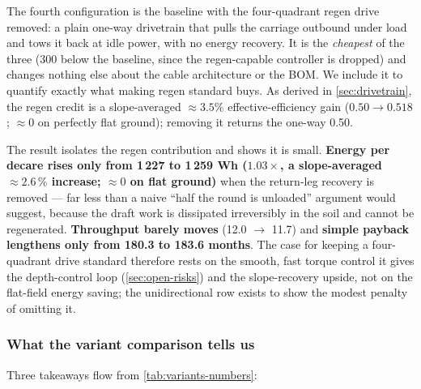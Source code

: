 \documentclass[11pt,a4paper]{article}
\begin{document}
The fourth configuration is the baseline with the four-quadrant regen drive removed: a plain one-way drivetrain that pulls the carriage outbound under load and tows it back at idle power, with no energy recovery. It is the \emph{cheapest} of the three (\SI{300}{\EUR} below the baseline, since the regen-capable controller is dropped) and changes nothing else about the cable architecture or the BOM. We include it to quantify exactly what making regen standard buys. As derived in \cref{sec:drivetrain}, the regen credit is a slope-averaged ${\approx}3.5\%$ effective-efficiency gain ($0.50 \to 0.518$; ${\approx}0$ on perfectly flat ground); removing it returns the one-way 0.50.

The result isolates the regen contribution and shows it is small. \textbf{Energy per decare rises only from 1\,227 to 1\,259 Wh ($1.03\times$, a slope-averaged ${\approx}2.6\,\%$ increase; ${\approx}0$ on flat ground)} when the return-leg recovery is removed --- far less than a naive ``half the round is unloaded'' argument would suggest, because the draft work is dissipated irreversibly in the soil and cannot be regenerated. \textbf{Throughput barely moves} (12.0 $\to$ 11.7) and \textbf{simple payback lengthens only from 180.3 to 183.6 months}. The case for keeping a four-quadrant drive standard therefore rests on the smooth, fast torque control it gives the depth-control loop (\cref{sec:open-risks}) and the slope-recovery upside, not on the flat-field energy saving; the unidirectional row exists to show the modest penalty of omitting it.

\subsubsection{What the variant comparison tells us}\label{sec:variants-discussion}

Three takeaways flow from \cref{tab:variants-numbers}:
\end{document}
